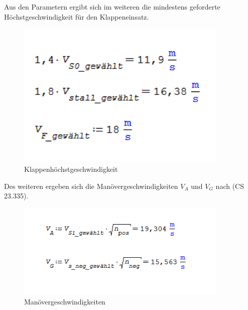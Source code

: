 Aus den Parametern ergibt sich im weiteren die mindestens geforderte Höchstgeschwindigkeit für den Klappeneinsatz.

\begin{figure}[H]
\centering
\includegraphics[width=0.9\textwidth]{bilder/Formeln/VF.png}
\caption{Klappenhöchstgeschwindigkeit} 
\label{fig:Klappenhöchstgeschwindigkeit}
\end{figure}

Des weiteren ergeben sich die Manövergeschwindigkeiten $V_{A}$ und $V_{G}$ nach (CS 23.335).


\begin{figure}[H]
\centering
\includegraphics[width=0.9\textwidth]{bilder/Formeln/V_g.png}
\caption{Manövergeschwindigkeiten} 
\label{fig:Manövergeschwindigkeiten}
\end{figure}
